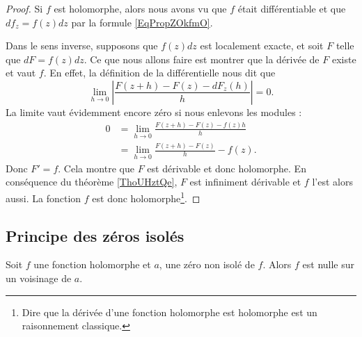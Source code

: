 \begin{proof}
    Si \( f\) est holomorphe, alors nous avons vu que \( f\) était différentiable et que \( df_{z}=f(z)dz\) par la formule \ref{EqPropZOkfmO}.

    Dans le sens inverse, supposons que \( f(z)dz\) est localement exacte, et soit \( F\) telle que \( dF=f(z)dz\). Ce que nous allons faire est montrer que la dérivée de \( F\) existe et vaut \( f\). En effet, la définition de la différentielle nous dit que
    \begin{equation}
        \lim_{h\to 0} \left| \frac{ F(z+h)-F(z)-dF_z(h) }{ h } \right| =0.
    \end{equation}
    La limite vaut évidemment encore zéro si nous enlevons les modules :
    \begin{subequations}
        \begin{align}
            0&=\lim_{h\to 0} \frac{ F(z+h)-F(z)-f(z)h }{ h }\\
            &=\lim_{h\to 0} \frac{ F(z+h)-F(z) }{ h }-f(z).
        \end{align}
    \end{subequations}
    Donc \( F'=f\). Cela montre que \( F\) est dérivable et donc holomorphe. En conséquence du théorème \ref{ThoUHztQe}, \( F\) est infiniment dérivable et \( f\) l'est alors aussi. La fonction \( f\) est donc holomorphe\footnote{Dire que la dérivée d'une fonction holomorphe est holomorphe est un raisonnement classique.}.
\end{proof}

\subsection{Principe des zéros isolés}

\begin{theorem}     \label{ThoukDPBX}
    Soit \( f\) une fonction holomorphe et \( a\), une zéro non isolé de \( f\). Alors \( f\) est nulle sur un voisinage de \( a\).
\end{theorem}

